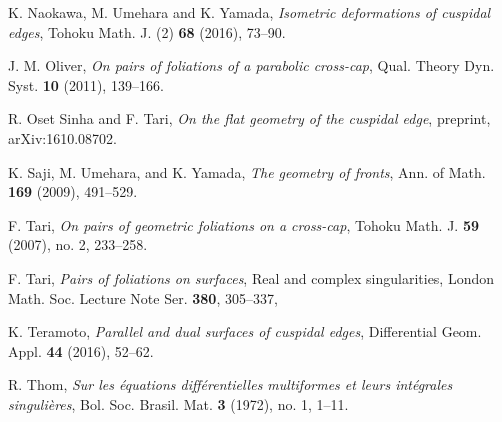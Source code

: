 \documentclass[a4paper, 12pt]{article}
\theoremstyle{definition}
\numberwithin{equation}{section}
\begin{document}
\begin{thebibliography}{99}
K. Naokawa, M. Umehara and K. Yamada,
{\it Isometric deformations of cuspidal edges},
Tohoku Math. J. (2) {\bf 68} (2016), 73--90.

J. M. Oliver,
{\itshape On pairs of foliations of
a parabolic cross-cap},
Qual. Theory Dyn. Syst.
{\bf 10} (2011), 139--166.

R. Oset Sinha and F. Tari,
{\it On the flat geometry of the cuspidal edge},
preprint, arXiv:1610.08702.

K. Saji, M. Umehara, and K. Yamada,
{\itshape The geometry of fronts},
Ann. of Math. {\bf 169} (2009), 491--529.

F. Tari, {\itshape On pairs of geometric foliations on a cross-cap}, 
Tohoku Math. J. {\bf 59} (2007), no. 2, 233--258.

F. Tari,
{\itshape Pairs of foliations on surfaces},
Real and complex singularities, 
London Math. Soc. Lecture Note Ser. {\bf 380}, 305--337,

K. Teramoto,
{\it Parallel and dual surfaces of cuspidal edges},
Differential Geom. Appl. {\bf 44} (2016), 52--62.

R. Thom,
{\itshape Sur les \'{e}quations diff\'{e}rentielles multiformes et leurs 
int\'{e}grales singuli\`{e}res},
Bol. Soc. Brasil. Mat. {\bf 3} (1972), no. 1, 1--11.

\end{thebibliography}

{\ifx\TOUKOU{}\else{{}}\fi}
\end{document}
